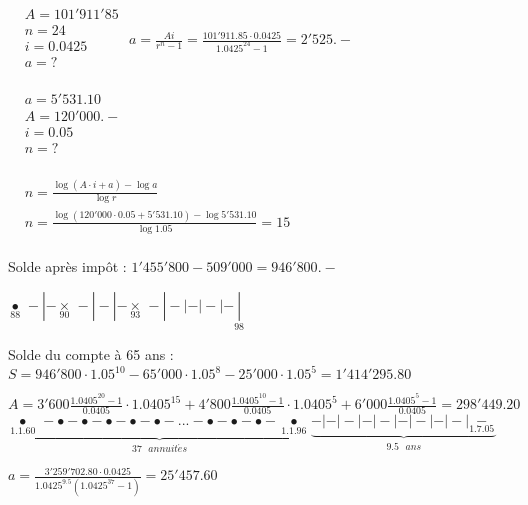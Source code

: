 \begin{solution}
$\begin{array}{ll}
  & A=101'911'85 \\ 
 & n=24 \\ 
 & i=0.0425 \\ 
 & a=? \\ 
\end{array}$		
$a=\frac{Ai}{{{r}^{n}}-1}=\frac{101'911.85\cdot 0.0425}{{{1.0425}^{24}}-1}=2'525.-$
\end{solution}

\begin{solution}
$\begin{array}{ll}
  & a=5'531.10 \\ 
 & A=120'000.- \\ 
 & i=0.05 \\ 
 & n=? \\ 
\end{array}$		

$\begin{array}{ll}
  & n=\frac{\log \left( A\cdot i+a \right)-\log a}{\log r} \\ 
 & n=\frac{\log \left( 120'000\cdot 0.05+5'531.10 \right)-\log 5'531.10}{\log 1.05}=15 \\ 
\end{array}$
\end{solution}

\begin{solution}
Solde après impôt : $1'455'800-509'000=946'800.-$

$\underset{88}{\mathop{\bullet }}\,-|-\underset{90}{\mathop{\times }}\,-|-|-\underset{93}{\mathop{\times }}\,-|-|-|-|-\underset{98}{\mathop{|}}\,$

Solde du compte à 65 ans : $S=946'800\cdot {{1.05}^{10}}-65'000\cdot {{1.05}^{8}}-25'000\cdot {{1.05}^{5}}=1'414'295.80$

$A=3'600\frac{{{1.0405}^{20}}-1}{0.0405}\cdot {{1.0405}^{15}}+4'800\frac{{{1.0405}^{10}}-1}{0.0405}\cdot {{1.0405}^{5}}+6'000\frac{{{1.0405}^{5}}-1}{0.0405}=298'449.20$
$\underbrace{\underset{1.1.60}{\mathop{\bullet }}\,-\bullet -\bullet -\bullet -\bullet -\bullet -...-\bullet -\bullet -\bullet -\underset{1.1.96}{\mathop{\bullet }}\,}_{37\text{ }annuit\acute{e}s}\underbrace{-|-|-|-|-|-|-|-|-|\underset{1.7.05}{\mathop{-}}\,}_{9.5\text{ }ans}$

$a=\frac{3'259'702.80\cdot 0.0425}{{{1.0425}^{9.5}}\left( {{1.0425}^{37}}-1 \right)}=25'457.60$
\end{solution}

